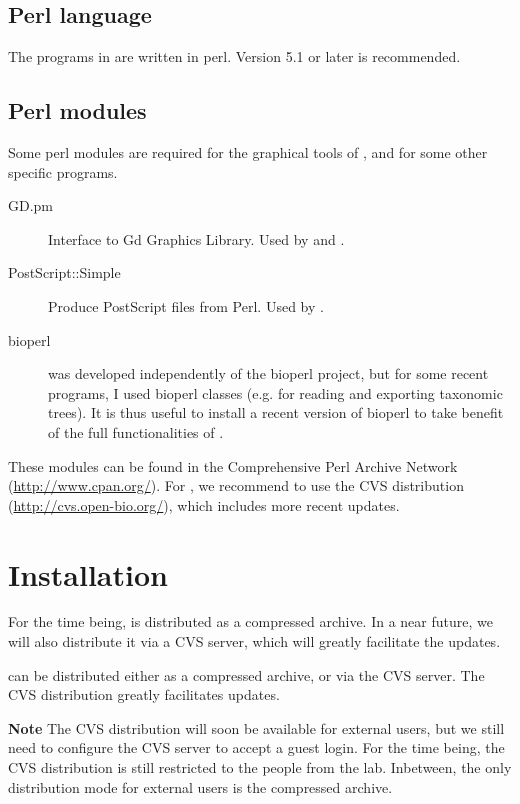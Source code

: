 \documentclass{article}
\begin{document}
\subsection{Perl language}

The programs in \RSAT are written in perl. Version 5.1 or
later is recommended.

\subsection{Perl modules}

Some perl modules are required for the graphical tools of \RSAT, and
for some other specific programs.

\begin{description}
\item[GD.pm] Interface to Gd Graphics Library. Used by
   and .
\item[PostScript::Simple] Produce PostScript files from Perl. Used by
  .
\item[bioperl] \RSAT was developed independently of the bioperl
  project, but for some recent programs, I used bioperl classes
  (e.g. for reading and exporting taxonomic trees). It is thus useful
  to install a recent version of bioperl to take benefit of the full
  functionalities of \RSAT.
\end{description}

These modules can be found in the Comprehensive Perl Archive Network
(\url{http://www.cpan.org/}). For , we recommend to
use the CVS distribution (\url{http://cvs.open-bio.org/}), which
includes more recent updates.


\section{Installation}

For the time being, \RSAT is distributed as a compressed archive. In a
near future, we will also distribute it via a CVS server, which will
greatly facilitate the updates.


\RSAT can be distributed either as a compressed archive, or via the CVS
server. The CVS distribution greatly facilitates updates.

\textbf{Note} The CVS distribution will soon be available for external
users, but we still need to configure the CVS server to accept a guest
login. For the time being, the CVS distribution is still restricted to
the people from the lab. Inbetween, the only distribution mode for
external users is the compressed archive.
\end{document}
